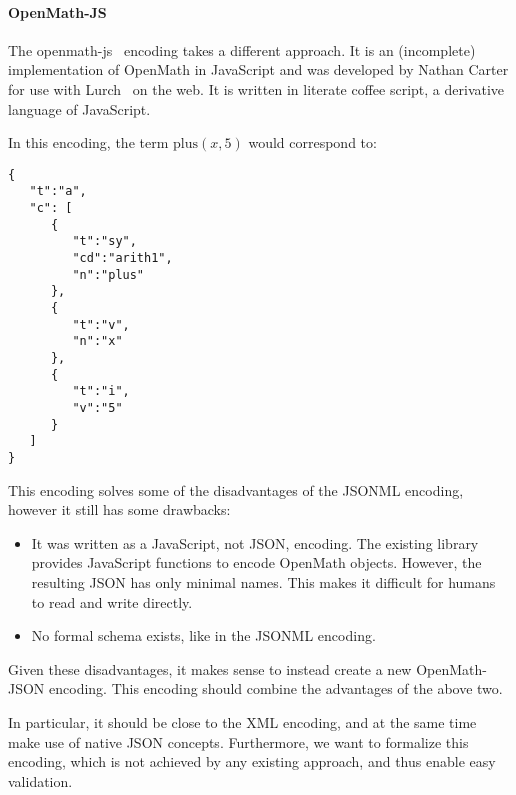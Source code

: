 \paragraph{OpenMath-JS}
The openmath-js~\cite{openmathjs:webpage} encoding takes a different approach. 
It is an (incomplete) implementation of OpenMath in JavaScript and was developed by Nathan Carter for use with Lurch~\cite{CarterMonks:OM:CICM-WS-WiP2013} on the web. 
It is written in literate coffee script, a derivative language of JavaScript. 

In this encoding, the term $\mathrm{plus}(x, 5)$ would correspond to: 
\begin{lstlisting}
{  
   "t":"a",
   "c": [  
      {  
         "t":"sy",
         "cd":"arith1",
         "n":"plus"
      },
      {  
         "t":"v",
         "n":"x"
      },
      {  
         "t":"i",
         "v":"5"
      }
   ]
}
\end{lstlisting}

This encoding solves some of the disadvantages of the JSONML encoding, however it still has some drawbacks:

\begin{itemize}
    \item It was written as a JavaScript, not JSON, encoding.
    The existing library provides JavaScript functions to encode OpenMath objects. 
    However, the resulting JSON has only minimal names. 
    This makes it difficult for humans to read and write directly. 

    \item No formal schema exists, like in the JSONML encoding. 
\end{itemize}


Given these disadvantages, it makes sense to instead create a new OpenMath-JSON encoding. 
This encoding should combine the advantages of the above two. 

In particular, it should be close to the XML encoding, and at the same time make use of native JSON concepts. 
Furthermore, we want to formalize this encoding, which is not achieved by any existing approach, and thus enable easy validation. 

